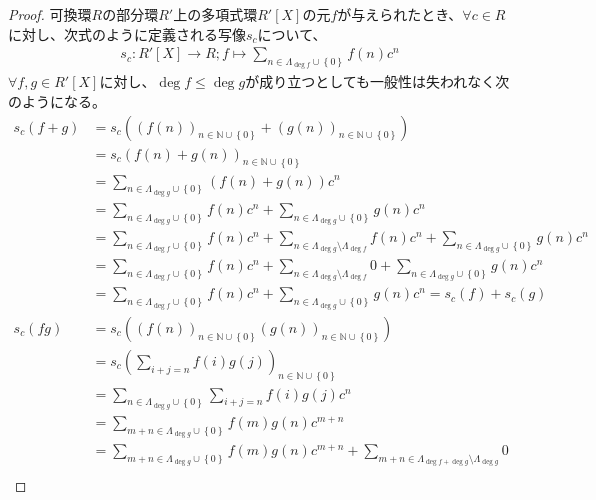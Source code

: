 \documentclass[dvipdfmx]{jsarticle}
\begin{document}
\begin{proof}
可換環$R$の部分環$R'$上の多項式環$R'[ X]$の元$f$が与えられたとき、$\forall c \in R$に対し、次式のように定義される写像$s_{c}$について、
\begin{align*}
s_{c}:R'[ X] \rightarrow R;f \mapsto \sum_{n \in \varLambda_{\deg f} \cup \left\{ 0 \right\}} {f(n)c^{n}}
\end{align*}
$\forall f,g \in R'[ X]$に対し、$\deg f \leq \deg g$が成り立つとしても一般性は失われなく次のようになる。
\begin{align*}
s_{c}(f + g) &= s_{c}\left( \left( f(n) \right)_{n \in \mathbb{N} \cup \left\{ 0 \right\}} + \left( g(n) \right)_{n \in \mathbb{N} \cup \left\{ 0 \right\}} \right)\\
&= s_{c}\left( f(n) + g(n) \right)_{n \in \mathbb{N} \cup \left\{ 0 \right\}}\\
&= \sum_{n \in \varLambda_{\deg g} \cup \left\{ 0 \right\}} {\left( f(n) + g(n) \right)c^{n}}\\
&= \sum_{n \in \varLambda_{\deg g} \cup \left\{ 0 \right\}} {f(n)c^{n}} + \sum_{n \in \varLambda_{\deg g} \cup \left\{ 0 \right\}} {g(n)c^{n}}\\
&= \sum_{n \in \varLambda_{\deg f} \cup \left\{ 0 \right\}} {f(n)c^{n}} + \sum_{n \in \varLambda_{\deg g} \setminus \varLambda_{\deg f}} {f(n)c^{n}} + \sum_{n \in \varLambda_{\deg g} \cup \left\{ 0 \right\}} {g(n)c^{n}}\\
&= \sum_{n \in \varLambda_{\deg f} \cup \left\{ 0 \right\}} {f(n)c^{n}} + \sum_{n \in \varLambda_{\deg g} \setminus \varLambda_{\deg f}} 0 + \sum_{n \in \varLambda_{\deg g} \cup \left\{ 0 \right\}} {g(n)c^{n}}\\
&= \sum_{n \in \varLambda_{\deg f} \cup \left\{ 0 \right\}} {f(n)c^{n}} + \sum_{n \in \varLambda_{\deg g} \cup \left\{ 0 \right\}} {g(n)c^{n}} = s_{c}(f) + s_{c}(g)\\
s_{c}(fg) &= s_{c}\left( \left( f(n) \right)_{n \in \mathbb{N} \cup \left\{ 0 \right\}}\left( g(n) \right)_{n \in \mathbb{N} \cup \left\{ 0 \right\}} \right)\\
&= s_{c}\left( \sum_{i + j = n} {f(i)g(j)} \right)_{n \in \mathbb{N} \cup \left\{ 0 \right\}}\\
&= \sum_{n \in \varLambda_{\deg g} \cup \left\{ 0 \right\}} {\sum_{i + j = n} {f(i)g(j)}c^{n}}\\
&= \sum_{m + n \in \varLambda_{\deg g} \cup \left\{ 0 \right\}} {f(m)g(n)c^{m + n}}\\
&= \sum_{m + n \in \varLambda_{\deg g} \cup \left\{ 0 \right\}} {f(m)g(n)c^{m + n}} + \sum_{m + n \in \varLambda_{\deg f + \deg g} \setminus \varLambda_{\deg g}} 0\\

\end{align*}
\end{proof}
\end{document}
